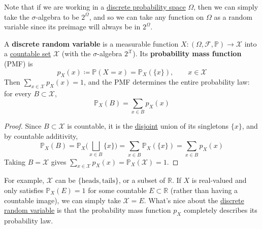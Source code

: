   Note that if we are working in a \hyperref[def:discrete-probability-space]{discrete probability space} $\Omega$, then we can simply take the $\sigma$-algebra to be $2^\Omega$, and so we can take any function on $\Omega$ as a random variable since its preimage will always be in $2^\Omega$. 

  \begin{definition}
    \label{def:discrete-random-variable}
    A \textbf{discrete random variable} is a measurable function $X: (\Omega, \mathcal{F}, \mathbb{P}) \to \mathcal{X}$ into a \hyperref[st-def:countable]{countable set} $\mathcal{X}$ (with the $\sigma$-algebra $2^{\mathcal{X}}$). Its \textbf{probability mass function} (PMF) is 
    \begin{equation}
      p_X (x) \coloneqq \mathbb{P}(X = x) = \mathbb{P}_X (\{x\}), \qquad x \in \mathcal{X}
    \end{equation}
    Then $\sum_{x \in \mathcal{X}} p_X (x) = 1$, and the PMF determines the entire probability law: for every $B \subset \mathcal{X}$, 
    \begin{equation}
      \mathbb{P}_X (B) = \sum_{x \in B} p_X (x)
    \end{equation}
  \end{definition}
  \begin{proof}
    Since $B \subset \mathcal{X}$ is countable, it is the \hyperref[st-def:disjoint-sets]{disjoint} union of its singletons $\{x\}$, and by countable additivity, 
    \begin{equation}
      \mathbb{P}_X (B) = \mathbb{P}_X \bigg( \bigsqcup_{x \in B} \{x\} \bigg) = \sum_{x \in B} \mathbb{P}_X (\{x\}) = \sum_{x \in B} p_X (x)
    \end{equation}
    Taking $B = \mathcal{X}$ gives $\sum_{x \in \mathcal{X}} p_X (x) = \mathbb{P}_X (\mathcal{X}) = 1$. 
  \end{proof}

  For example, $\mathcal{X}$ can be $\{\text{heads}, \text{tails}\}$, or a subset of $\mathbb{R}$. If $X$ is real-valued and only satisfies $\mathbb{P}_X (E) = 1$ for some countable $E \subset \mathbb{R}$ (rather than having a countable image), we can simply take $\mathcal{X} = E$. What's nice about the \hyperref[def:discrete-random-variable]{discrete random variable} is that the probability mass function $p_X$ completely describes its probability law. 

